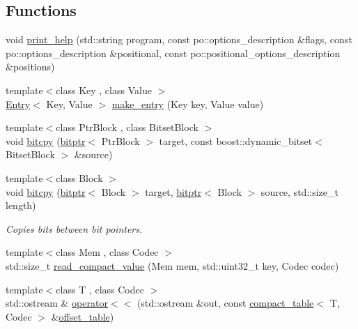 \subsection*{Functions}
\begin{DoxyCompactItemize}
\item 
void \mbox{\hyperlink{namespaceirk_a955c6546f4b05a706dcc5608ce7bbad3}{print\+\_\+help}} (std\+::string program, const po\+::options\+\_\+description \&flags, const po\+::options\+\_\+description \&positional, const po\+::positional\+\_\+options\+\_\+description \&positions)
\item 
{\footnotesize template$<$class Key , class Value $>$ }\\\mbox{\hyperlink{structirk_1_1Entry}{Entry}}$<$ Key, Value $>$ \mbox{\hyperlink{namespaceirk_a7ffa1ad895f0122cd4137358bf83447c}{make\+\_\+entry}} (Key key, Value value)
\item 
{\footnotesize template$<$class Ptr\+Block , class Bitset\+Block $>$ }\\void \mbox{\hyperlink{namespaceirk_ae79f958d4bca4bb9e05628261f2fb725}{bitcpy}} (\mbox{\hyperlink{classirk_1_1bitptr}{bitptr}}$<$ Ptr\+Block $>$ target, const boost\+::dynamic\+\_\+bitset$<$ Bitset\+Block $>$ \&source)
\item 
{\footnotesize template$<$class Block $>$ }\\void \mbox{\hyperlink{namespaceirk_a339a0543200e91f59773f625063c959c}{bitcpy}} (\mbox{\hyperlink{classirk_1_1bitptr}{bitptr}}$<$ Block $>$ target, \mbox{\hyperlink{classirk_1_1bitptr}{bitptr}}$<$ Block $>$ source, std\+::size\+\_\+t length)
\begin{DoxyCompactList}\small\item\em Copies bits between bit pointers. \end{DoxyCompactList}\item 
{\footnotesize template$<$class Mem , class Codec $>$ }\\std\+::size\+\_\+t \mbox{\hyperlink{namespaceirk_a5a2bb996aa2fce0aa00ae9aafd500bba}{read\+\_\+compact\+\_\+value}} (Mem mem, std\+::uint32\+\_\+t key, Codec codec)
\item 
{\footnotesize template$<$class T , class Codec $>$ }\\std\+::ostream \& \mbox{\hyperlink{namespaceirk_a9cf133b170be4f5de9135aa3936012e9}{operator$<$$<$}} (std\+::ostream \&out, const \mbox{\hyperlink{classirk_1_1compact__table}{compact\+\_\+table}}$<$ T, Codec $>$ \&\mbox{\hyperlink{classirk_1_1offset__table}{offset\+\_\+table}})
\item 

\end{DoxyCompactItemize}
